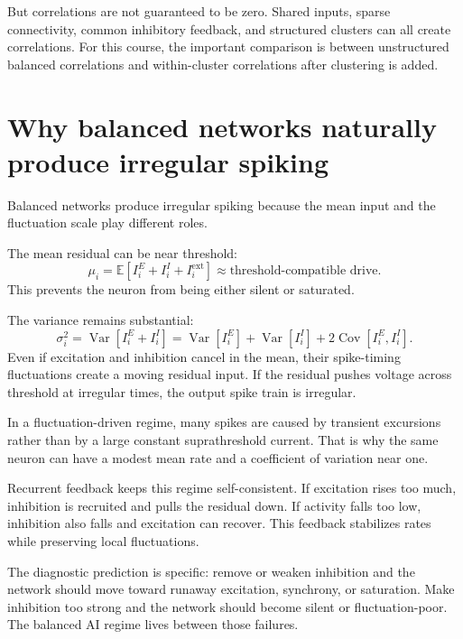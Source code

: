 But correlations are not guaranteed to be zero. Shared inputs, sparse connectivity, common inhibitory feedback, and structured clusters can all create correlations. For this course, the important comparison is between unstructured balanced correlations and within-cluster correlations after clustering is added.

\section{Why balanced networks naturally produce irregular spiking}
\label{sec:why-balance-produces-irregular-spiking}

Balanced networks produce irregular spiking because the mean input and the fluctuation scale play different roles.

The mean residual can be near threshold:
%
\begin{equation}
  \mu_i
  =
  \mathbb{E}[I_i^E+I_i^I+I_i^{\mathrm{ext}}]
  \approx
  \text{threshold-compatible drive}.
  \label{eq:threshold-compatible-drive}
\end{equation}
%
This prevents the neuron from being either silent or saturated.

The variance remains substantial:
%
\begin{equation}
  \sigma_i^2
  =
  \operatorname{Var}[I_i^E+I_i^I]
  =
  \operatorname{Var}[I_i^E]
  +
  \operatorname{Var}[I_i^I]
  +
  2\operatorname{Cov}[I_i^E,I_i^I].
  \label{eq:residual-input-variance}
\end{equation}
%
Even if excitation and inhibition cancel in the mean, their spike-timing fluctuations create a moving residual input. If the residual pushes voltage across threshold at irregular times, the output spike train is irregular.

In a fluctuation-driven regime, many spikes are caused by transient excursions rather than by a large constant suprathreshold current. That is why the same neuron can have a modest mean rate and a coefficient of variation near one.

Recurrent feedback keeps this regime self-consistent. If excitation rises too much, inhibition is recruited and pulls the residual down. If activity falls too low, inhibition also falls and excitation can recover. This feedback stabilizes rates while preserving local fluctuations.

The diagnostic prediction is specific: remove or weaken inhibition and the network should move toward runaway excitation, synchrony, or saturation. Make inhibition too strong and the network should become silent or fluctuation-poor. The balanced AI regime lives between those failures.

